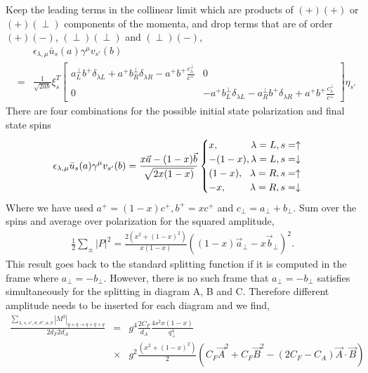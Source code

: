 \begin{appendices}
Keep the leading terms in the collinear limit which are products of $(+)(+)$ or $(+)(\perp)$ components of the momenta, and drop terms that are of order $(+)(-)$, $(\perp)(\perp)$ and $(\perp)(-)$,
\begin{eqnarray}
&&\epsilon_{\lambda, \mu} \bar{u}_s(a)\gamma^\mu v_{s'}(b)\\
&=& \frac{1}{\sqrt{2ab}}
\xi_s^T
\begin{bmatrix}
a^\perp_L b^+ \delta_{\lambda L} + a^+ b^\perp_R \delta_{\lambda R} - a^+ b^+\frac{c^\perp_\lambda}{c^+} & 0\\
0 & -a^+ b^\perp_L \delta_{\lambda L} - a^\perp_R b^+ \delta_{\lambda R} + a^+ b^+\frac{c^\perp_\lambda}{c^+}
\end{bmatrix}
\eta_{s'}
\end{eqnarray}
There are four combinations for the possible initial state polarization and final state spins
\begin{eqnarray}
\epsilon_{\lambda, \mu} \bar{u}_s(a)\gamma^\mu v_{s'}(b) = \frac{x\vec{a} - (1-x)\vec{b}}{\sqrt{2x(1-x)}}
\begin{cases}
x, \hfill \lambda=L, s=\uparrow\\
-(1-x), \hfill \lambda=L, s=\downarrow\\
(1-x), \hfill \lambda=R, s=\uparrow\\
-x, \hfill \lambda=R, s=\downarrow\\
\end{cases}
\end{eqnarray}
Where we have used $a^+ = (1-x)c^+, b^+ = xc^+$ and $c_\perp = a_\perp+b_\perp$.
Sum over the spins and average over polarization for the squared amplitude,
\begin{eqnarray}
\frac{1}{2}\sum_\pm |P|^2 = \frac{2(x^2 + (1-x)^2)}{x(1-x)} \left((1-x)\vec{a}_\perp-x\vec{b}_\perp\right)^2.
\end{eqnarray}
This result goes back to the standard splitting function if it is computed in the frame where $a_\perp = -b_\perp$. 
However, there is no such frame that $a_\perp = -b_\perp$ satisfies simultaneously for the splitting in diagram A, B and C.
Therefore different amplitude needs to be inserted for each diagram and we find,
\begin{eqnarray}
\label{eq:gq2qqbarq}
\frac{\sum_{\lambda, s, s', \sigma, \sigma', a, b}|M^2|_{g+q\rightarrow q+\bar{q}+q}}{2d_F 2d_A} &=& g^4 \frac{2C_F}{d_A}\frac{4s^2 x(1-x)}{q_\perp^4}  \\\nonumber
&\times& g^2\frac{(x^2+(1-x)^2)}{2} \left(C_F \vec{A}^2 + C_F \vec{B}^2 - (2C_F- C_A)\vec{A}\cdot\vec{B}\right)

\end{eqnarray}
\end{appendices}
